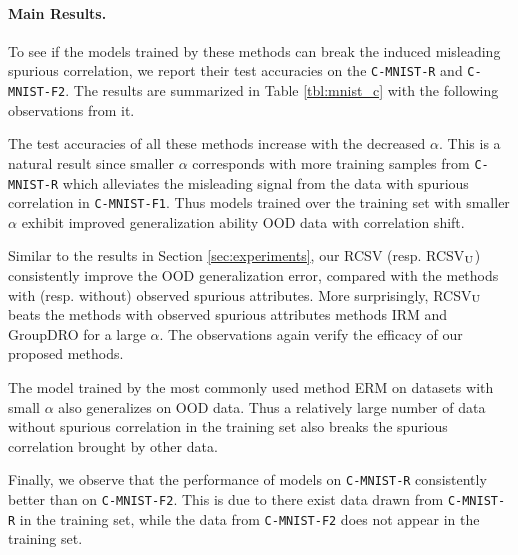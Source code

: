 \paragraph{Main Results.} To see if the models trained by these methods can break the induced misleading spurious correlation, we report their test accuracies on the \texttt{C-MNIST-R} and \texttt{C-MNIST-F2}. The results are summarized in Table \ref{tbl:mnist_c} with the following observations from it. 
\par
The test accuracies of all these methods increase with the decreased $\alpha$. This is a natural result since smaller $\alpha$ corresponds with more training samples from \texttt{C-MNIST-R} which alleviates the misleading signal from the data with spurious correlation in \texttt{C-MNIST-F1}. Thus models trained over the training set with smaller $\alpha$ exhibit improved generalization ability OOD data with correlation shift.  
\par
Similar to the results in Section \ref{sec:experiments}, our RCSV (resp. RCSV$_{\rm U}$) consistently improve the OOD generalization error, compared with the methods with (resp. without) observed spurious attributes. More surprisingly, RCSV$_{\rm U}$ beats the methods with observed spurious attributes methods IRM and GroupDRO for a large $\alpha$. The observations again verify the efficacy of our proposed methods. 
\par
The model trained by the most commonly used method ERM on datasets with small $\alpha$ also generalizes on OOD data. Thus a relatively large number of data without spurious correlation in the training set also breaks the spurious correlation brought by other data. 
\par
Finally, we observe that the performance of models on \texttt{C-MNIST-R} consistently better than on \texttt{C-MNIST-F2}. This is due to there exist data drawn from \texttt{C-MNIST-R} in the training set, while the data from \texttt{C-MNIST-F2} does not appear in the training set.              

